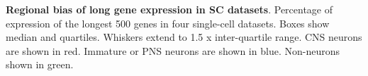\textbf{Regional bias of long gene expression in SC datasets}. Percentage of expression of the longest 500 genes in four single-cell datasets. Boxes show median and quartiles. Whiskers extend to 1.5 x inter-quartile range. CNS neurons are shown in red. Immature or PNS neurons are shown in blue. Non-neurons shown in green.

